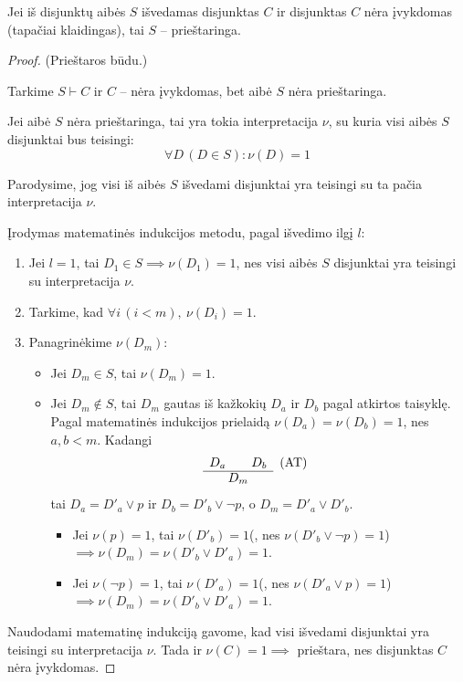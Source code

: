 \begin{prop}
  \label{tg6}
  Jei iš disjunktų aibės $S$ išvedamas disjunktas $C$ ir disjunktas $C$
  nėra įvykdomas (tapačiai klaidingas), tai $S$ – prieštaringa.

  \begin{proof}
    (Prieštaros būdu.)

    Tarkime $S \vdash C$ ir $C$ – nėra įvykdomas, bet aibė $S$ nėra 
    prieštaringa.

    Jei aibė $S$ nėra prieštaringa, tai yra tokia interpretacija $\nu$,
    su kuria visi aibės $S$ disjunktai bus teisingi:
    \[
    \forall D \, (D \in S) : \nu(D) = 1
    \]

    Parodysime, jog visi iš aibės $S$ išvedami disjunktai yra teisingi su 
    ta pačia interpretacija $\nu$.

    Įrodymas matematinės indukcijos metodu, pagal išvedimo ilgį $l$:

    \begin{enumerate}
      \item Jei $l = 1$, tai $D_{1} \in S \implies \nu(D_{1}) = 1$,
        nes visi aibės $S$ disjunktai yra teisingi su interpretacija $\nu$.
      \item Tarkime, kad $\forall i \, (i < m),\: \nu(D_{i}) = 1$.
      \item Panagrinėkime $\nu(D_{m})$:
        \begin{itemize}
          \item Jei $D_{m} \in S$, tai $\nu(D_{m}) = 1$.
          \item Jei $D_{m} \not \in S$, tai $D_{m}$ gautas iš kažkokių 
            $D_{a}$ ir $D_{b}$ pagal atkirtos taisyklę. Pagal matematinės
            indukcijos prielaidą $\nu(D_{a}) = \nu(D_{b}) = 1$, 
            nes $a, b < m$. Kadangi 
            \[ 
            \begin{array}{c l} 
              D_{a} \qquad D_{b} & \text{(AT)} \\ 
              \cline{1-1} 
              D_{m} & {} 
            \end{array} 
            \]
            tai $D_{a} = D'_{a} \lor p$ ir $D_{b} = D'_{b} \lor \neg p$, o
            $D_{m} = D'_{a} \lor D'_{b}$.
            \begin{itemize}
              \item Jei $\nu(p) = 1$, tai $\nu(D'_{b}) = 1$(, nes 
                $\nu(D'_{b} \lor \neg p) = 1$) 
                $\implies \nu(D_{m}) = \nu(D'_{b} \lor D'_{a}) = 1$.
              \item Jei $\nu(\neg p) = 1$, tai $\nu(D'_{a}) = 1$(, nes
                $\nu(D'_{a} \lor p) = 1$)
                $\implies \nu(D_{m}) = \nu(D'_{b} \lor D'_{a}) = 1$.
            \end{itemize}
        \end{itemize}
    \end{enumerate}
    Naudodami matematinę indukciją gavome, kad visi išvedami disjunktai
    yra teisingi su interpretacija $\nu$. Tada ir $\nu(C) = 1 \implies$
    prieštara, nes disjunktas $C$ nėra įvykdomas.
  \end{proof}

\end{prop}

